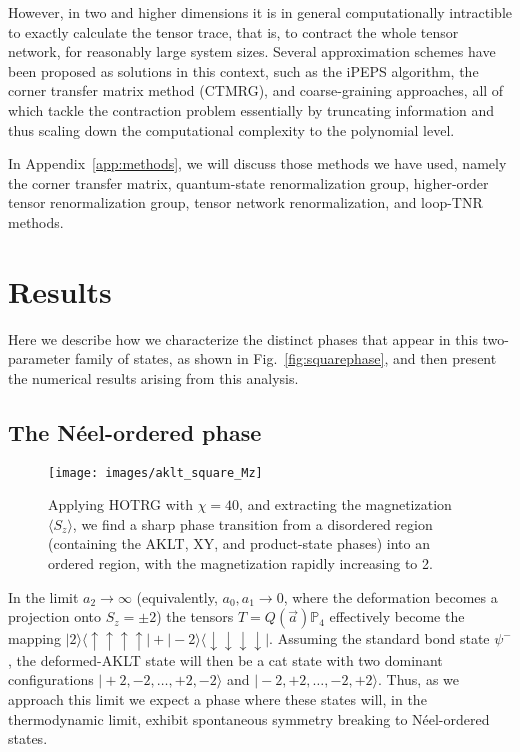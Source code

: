 \documentclass[aps,prb,letterpaper,superscriptaddress,twocolumn,showpacs,floatfix,10pt]{revtex4-1}
\begin{document}
However, in two and higher dimensions it is in general computationally
intractible to exactly calculate the tensor trace, that is, to contract the
whole tensor network, for reasonably large system sizes.
Several approximation schemes have been proposed as solutions in this context,
such as the iPEPS algorithm\cite{Vidal_iPEPS_2009}, the corner transfer matrix
method (CTMRG)\cite{Nishino_CTMRG_1997,OrusCTM}, and coarse-graining
approaches\cite{Levin_TRG_2007,Xiang_TRG_2008,Wen_Gu_Levin_TRG_2008,TNR}, all
of which tackle the contraction problem essentially by truncating information
and thus scaling down the computational complexity to the polynomial level.

In Appendix~\ref{app:methods},
we will discuss those methods we have used, namely the corner transfer matrix,
quantum-state renormalization group, higher-order tensor renormalization group, 
tensor network renormalization, and loop-TNR methods.


\FloatBarrier
\section{Results}
\label{sec:phases}

Here we describe how we characterize the distinct phases that
appear in this two-parameter family of states, as shown in
Fig.~\ref{fig:squarephase}, and then
present the numerical results arising
from this analysis.
\subsection{The N\'eel-ordered phase}
\label{sec:ordered}

\begin{figure}[h!]
\texttt{[image: images/aklt\_square\_Mz]}
\caption{Applying HOTRG with $\chi=40$, and extracting the magnetization 
$\langle S_z\rangle$, we find a sharp phase transition from a disordered
region (containing the AKLT, XY, and product-state phases) into an ordered
region, with the magnetization rapidly increasing to 2.}
\label{fig:square_Mz}
\end{figure}
In the limit $a_2\to \infty$ (equivalently, $a_0,a_1 \to 0$, where
the deformation becomes a projection onto $S_z=\pm 2$) the tensors
$T = Q(\vec{a})\mathbb{P}_4$ effectively become the mapping
$|2\rangle\langle\uparrow\uparrow\uparrow\uparrow\!\!| + 
|\!-2\rangle\langle\downarrow\downarrow\downarrow\downarrow\!\!|$.
Assuming the standard bond state $\psi^-$, the deformed-AKLT state
will then be a cat
state with two dominant configurations $|\!+\!2,-2,\ldots,+2,-2\rangle$ and
$|\!-\!2,+2,\ldots,-2,+2\rangle$. Thus, as we approach this limit  we expect a
phase where these states
will, in the thermodynamic limit, exhibit spontaneous symmetry breaking
to N\'eel-ordered states.
\end{document}
